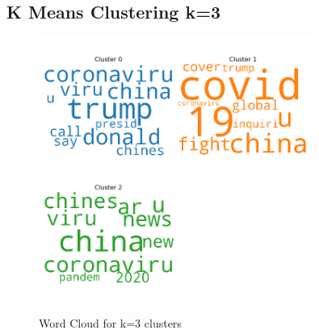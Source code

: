 \appendix



\begin{appendices}
	\section{K Means Clustering k=3}
	\label{k3}
	\begin{figure}[H]
		\centering
		\includegraphics[width=0.8\textwidth]{images/kmeans_word_cloud_k=3.png}
		\caption{Word Cloud for k=3 clusters}
		\label{fig:wck3}
	\end{figure}
	

\end{appendices}
